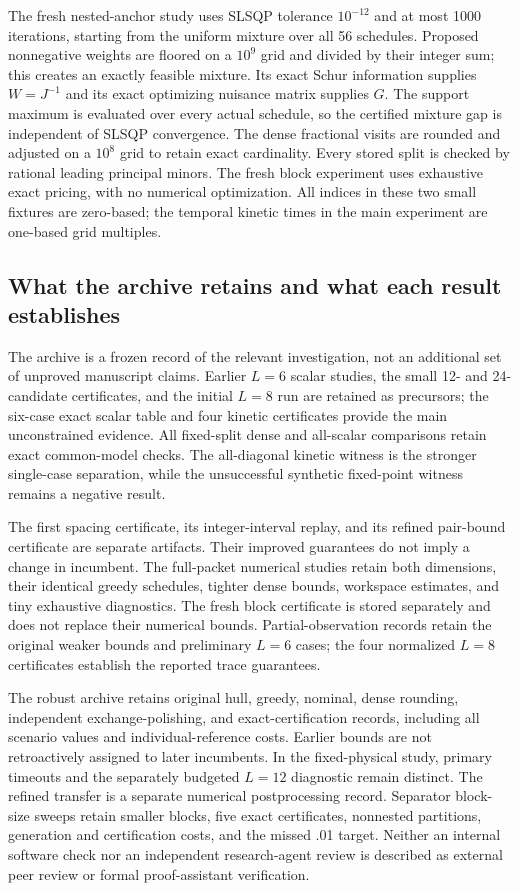The fresh nested-anchor study uses SLSQP tolerance $10^{-12}$ and at most
1000 iterations, starting from the uniform mixture over all 56 schedules.
Proposed nonnegative weights are floored on a $10^9$ grid and divided by their
integer sum; this creates an exactly feasible mixture. Its exact Schur
information supplies $W=J^{-1}$ and its exact optimizing nuisance matrix
supplies $G$. The support maximum is evaluated over every actual schedule,
so the certified mixture gap is independent of SLSQP convergence. The dense
fractional visits are rounded and adjusted on a $10^8$ grid to retain exact
cardinality. Every stored split is checked by rational leading principal
minors. The fresh block experiment uses exhaustive exact pricing, with no
numerical optimization. All indices in these two small fixtures are zero-based;
the temporal kinetic times in the main experiment are one-based grid multiples.

\subsection{What the archive retains and what each result establishes}

The archive is a frozen record of the relevant investigation, not an additional
set of unproved manuscript claims. Earlier $L=6$ scalar studies, the small
12- and 24-candidate certificates, and the initial $L=8$ run are retained as
precursors; the six-case exact scalar table and four kinetic certificates
provide the main unconstrained evidence. All fixed-split dense and all-scalar
comparisons retain exact common-model checks. The all-diagonal kinetic witness
is the stronger single-case separation, while the unsuccessful synthetic
fixed-point witness remains a negative result.

The first spacing certificate, its integer-interval replay, and its refined
pair-bound certificate are separate artifacts. Their improved guarantees do
not imply a change in incumbent. The full-packet numerical studies retain
both dimensions, their identical greedy schedules, tighter dense bounds,
workspace estimates, and tiny exhaustive diagnostics. The fresh block
certificate is stored separately and does not replace their numerical bounds.
Partial-observation records retain the original weaker bounds and preliminary
$L=6$ cases; the four normalized $L=8$ certificates establish the reported
trace guarantees.

The robust archive retains original hull, greedy, nominal, dense rounding,
independent exchange-polishing, and exact-certification records, including all
scenario values and individual-reference costs. Earlier bounds are not
retroactively assigned to later incumbents. In the fixed-physical study,
primary timeouts and the separately budgeted $L=12$ diagnostic remain distinct.
The refined transfer is a separate numerical postprocessing record. Separator
block-size sweeps retain smaller blocks, five exact certificates, nonnested
partitions, generation and certification costs, and the missed .01 target.
Neither an internal software check nor an independent research-agent review
is described as external peer review or formal proof-assistant verification.

